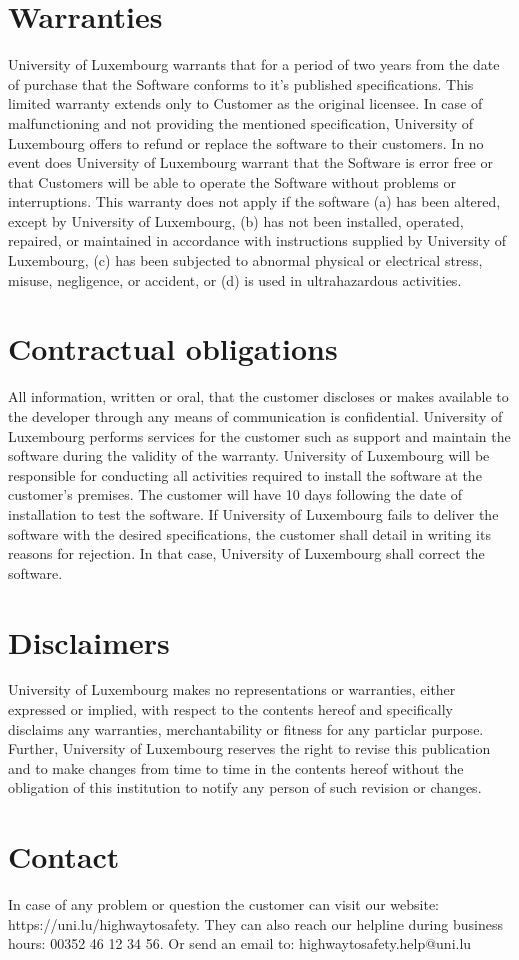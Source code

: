 \section{Warranties}
University of Luxembourg warrants that for a period of two years from the date
of purchase that the Software conforms to it's published specifications. This
limited warranty extends only to Customer as the original licensee. In case of
malfunctioning and not providing the mentioned specification, University of
Luxembourg offers to refund or replace the software to their customers. In no
event does University of Luxembourg warrant that the Software is error free or
that Customers will be able to operate the Software without problems or
interruptions. This warranty does not apply if the software (a) has been
altered, except by University of Luxembourg, (b) has not been installed,
operated, repaired, or maintained in accordance with instructions supplied by
University of Luxembourg, (c) has been subjected to abnormal physical or
electrical stress, misuse, negligence, or accident, or (d) is used in
ultrahazardous activities.

\section{Contractual obligations}
All information, written or oral, that the customer discloses or makes available
to the developer through any means of communication is confidential.
University of Luxembourg performs services for the customer such as support and
maintain the software during the validity of the warranty.
University of Luxembourg will be responsible for conducting all activities
required to install the software at the customer's premises.
The customer will have 10 days following the date of installation to test the
software.
If University of Luxembourg fails to deliver the software with the desired
specifications, the customer shall detail in writing its reasons for rejection.
In that case, University of Luxembourg shall correct the software.

\section{Disclaimers}
University of Luxembourg makes no representations or warranties, either
expressed or implied, with respect to the contents hereof and specifically
disclaims any warranties, merchantability or fitness for any particlar purpose.
Further, University of Luxembourg reserves the right to revise this publication
and to make changes from time to time in the contents hereof without the
obligation of this institution to notify any person of such revision or changes.

\section{Contact}
In case of any problem or question the customer can visit our website:
https://uni.lu/highwaytosafety.                                                 
They can also reach our helpline during business hours: 00352 46 12 34 56.      
Or send an email to: highwaytosafety.help@uni.lu